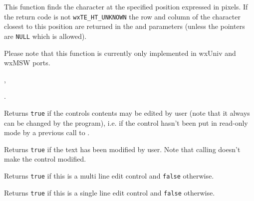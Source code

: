 
This function finds the character at the specified position expressed in
pixels. If the return code is not \texttt{wxTE\_HT\_UNKNOWN} the row and column
of the character closest to this position are returned in the  and 
 parameters (unless the pointers are {\tt{NULL}} which is allowed).

Please note that this function is currently only implemented in wxUniv and
wxMSW ports.


, 

.

\label{wxtextctrliseditable}


Returns {\tt true} if the controls contents may be edited by user (note that it
always can be changed by the program), i.e. if the control hasn't been put in
read-only mode by a previous call to 
.


\label{wxtextctrlismodified}


Returns {\tt true} if the text has been modified by user. Note that calling 
 doesn't make the control modified.


\label{wxtextctrlismultiline}


Returns {\tt true} if this is a multi line edit control and {\tt false}
otherwise.




\label{wxtextctrlissingleline}


Returns {\tt true} if this is a single line edit control and {\tt false}
otherwise.

